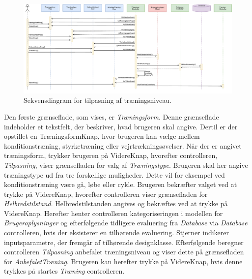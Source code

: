 \begin{figure} [H]
\centering
\includegraphics[width=1.55\textwidth, angle=90]{figures/Sek/SEKTilpasning}
\caption{Sekvensdiagram for tilpasning af træningsniveau.}
\label{fig:SEKTilpasning}
\end{figure}

\noindent
Den første grænseflade, som vises, er \textit{Træningsform}. Denne grænseflade indeholder et tekstfelt, der beskriver, hvad brugeren skal angive. Dertil er der opstillet en TræningsformKnap, hvor brugeren kan vælge mellem konditionstræning, styrketræning eller vejrtrækningsøvelser. Når der er angivet træningsform, trykker brugeren på VidereKnap, hvorefter controlleren, \textit{Tilpasning}, viser grænsefladen for valg af \textit{Træningstype}. Brugeren skal her angive træningstype ud fra tre forskellige muligheder. Dette vil for eksempel ved konditionstræning være gå, løbe eller cykle. Brugeren bekræfter valget ved at trykke på VidereKnap, hvorefter controlleren viser grænsefladen for \textit{Helbredstilstand}. Helbredstilstanden angives og bekræftes ved at trykke på VidereKnap. Herefter henter controlleren kategoriseringen i modellen for \textit{Brugeroplysninger} og efterfølgende tidligere evaluering fra \textit{Database} via \textit{Database} controlleren, hvis der eksisterer en tilhørende evaluering. Stjerner indikerer inputsparametre, der fremgår af tilhørende designklasse.
Efterfølgende beregner controlleren \textit{Tilpasning} anbefalet træningsniveau og viser dette på grænsefladen for \textit{AnbefaletTræning}. Brugeren kan herefter trykke på VidereKnap, hvis denne trykkes på startes \textit{Træning} controlleren. 
